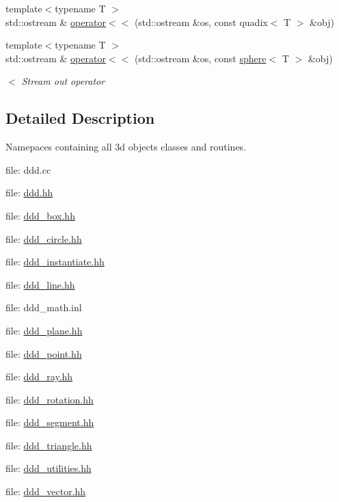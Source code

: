 \begin{DoxyCompactItemize}
{\footnotesize template$<$typename T $>$ }\\std\+::ostream \& \hyperlink{namespaceddd_a58ae88cefdf3b919e400db6de59f4cfc}{operator$<$$<$} (std\+::ostream \&os, const quadix$<$ T $>$ \&obj)
\item 
{\footnotesize template$<$typename T $>$ }\\std\+::ostream \& \hyperlink{namespaceddd_a64dbb41c0ee377eb528907f3448514f6}{operator$<$$<$} (std\+::ostream \&os, const \hyperlink{classddd_1_1sphere}{sphere}$<$ T $>$ \&obj)
\begin{DoxyCompactList}\small\item\em $<$ Stream out operator \end{DoxyCompactList}\end{DoxyCompactItemize}


\subsection{Detailed Description}
Namepaces containing all 3d objects classes and routines. 

file\+: ddd.\+cc

file\+: \hyperlink{ddd_8hh_source}{ddd.\+hh}

file\+: \hyperlink{ddd__box_8hh_source}{ddd\+\_\+box.\+hh}

file\+: \hyperlink{ddd__circle_8hh_source}{ddd\+\_\+circle.\+hh}

file\+: \hyperlink{ddd__instantiate_8hh_source}{ddd\+\_\+instantiate.\+hh}

file\+: \hyperlink{ddd__line_8hh_source}{ddd\+\_\+line.\+hh}

file\+: ddd\+\_\+math.\+inl

file\+: \hyperlink{ddd__plane_8hh_source}{ddd\+\_\+plane.\+hh}

file\+: \hyperlink{ddd__point_8hh_source}{ddd\+\_\+point.\+hh}

file\+: \hyperlink{ddd__ray_8hh_source}{ddd\+\_\+ray.\+hh}

file\+: \hyperlink{ddd__rotation_8hh_source}{ddd\+\_\+rotation.\+hh}

file\+: \hyperlink{ddd__segment_8hh_source}{ddd\+\_\+segment.\+hh}

file\+: \hyperlink{ddd__triangle_8hh_source}{ddd\+\_\+triangle.\+hh}

file\+: \hyperlink{ddd__utilities_8hh_source}{ddd\+\_\+utilities.\+hh}

file\+: \hyperlink{ddd__vector_8hh_source}{ddd\+\_\+vector.\+hh} 

